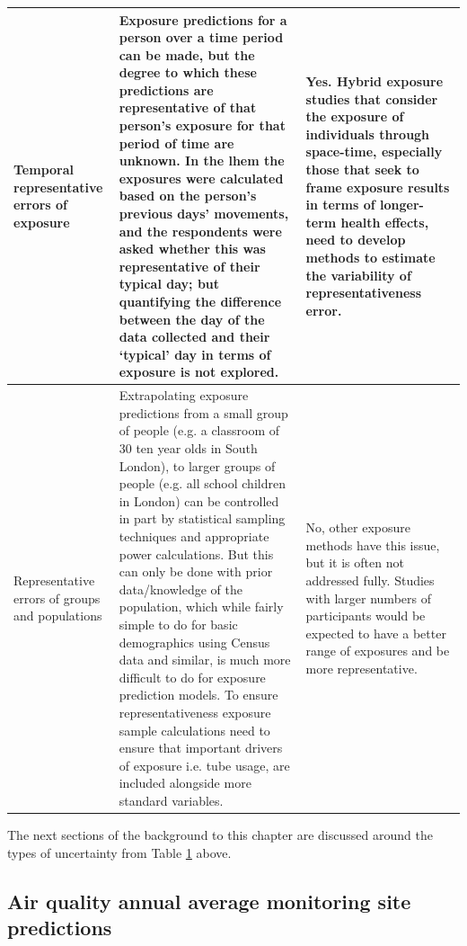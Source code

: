\begin{landscape}
\begin{table}[ht]
\begin{tabular}{ | p{3.9cm} | p{13.0cm} | p{7.4cm} |}
        Temporal representative errors of exposure  &   Exposure predictions for a person over a time period can be made, but the degree to which these predictions are representative of that person’s exposure for that period of time are unknown. In the \gls{lhem} the exposures were calculated based on the person’s previous days’ movements, and the respondents were asked whether this was representative of their typical day; but quantifying the difference between the day of the data collected and their ‘typical’ day in terms of exposure is not explored.         &    Yes. Hybrid exposure studies that consider the exposure of individuals through space-time, especially those that seek to frame exposure results in terms of longer-term health effects, need to develop methods to estimate the variability of representativeness error.       \\ \hline
        
        Representative errors of groups and populations  &   Extrapolating exposure predictions from a small group of people (e.g. a classroom of 30 ten year olds in South London), to larger groups of people (e.g. all school children in London) can be controlled in part by statistical sampling techniques and appropriate power calculations. But this can only be done with prior data/knowledge of the population, which while fairly simple to do for basic demographics using Census data and similar, is much more difficult to do for exposure prediction models. To ensure representativeness exposure sample calculations need to ensure that important drivers of exposure i.e. tube usage, are included alongside more standard variables.        &   No, other exposure methods have this issue, but it is often not addressed fully. Studies with larger numbers of participants would be expected to have a better range of exposures and be more representative.        \\ \hline
\end{tabular}
\label{tab:exposure_error_table}
\vspace{-1pt}
\end{table}

\end{landscape}

\restoregeometry

The next sections of the background to this chapter are discussed around the types of uncertainty from Table \ref{tab:exposure_error_table} above.

\subsection{Air quality annual average monitoring site predictions}
\label{air_quality_annual_average_predictions}

